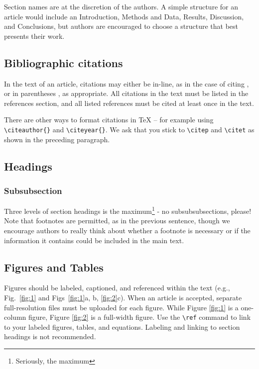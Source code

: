 \documentclass[]{seismica}
\begin{document}
	Section names are at the discretion of the authors. A simple structure for an article would include an Introduction, Methods and Data, Results, Discussion, and Conclusions, but authors are encouraged to choose a structure that best presents their work.
	
	\subsection{Bibliographic citations}
	In the text of an article, citations may either be in-line, as in the case of citing \citet{metropolis_monte_1949}, or in parentheses \citep[e.g.,][]{metropolis_monte_1949}, as appropriate. All citations in the text must be listed in the references section, and all listed references must be cited at least once in the text. 

        There are other ways to format citations in TeX -- for example using \texttt{\textbackslash citeauthor\{\}} and \texttt{\textbackslash citeyear\{\}}. We ask that you stick to \texttt{\textbackslash citep} and \texttt{\textbackslash citet} as shown in the preceding paragraph.
	
	\subsection{Headings}
	\subsubsection{Subsubsection}
	Three levels of section headings is the maximum\footnote{Seriously, the maximum} - no subsubsubsections, please! Note that footnotes are permitted, as in the previous sentence, though we encourage authors to really think about whether a footnote is necessary or if the information it contains could be included in the main text.
	
	\subsection{Figures and Tables}
	Figures should be labeled, captioned, and referenced within the text (e.g., Fig.~\ref{fig:1} and Figs~\ref{fig:1}a, b, \ref{fig:2}c). When an article is accepted, separate full-resolution files must be uploaded for each figure. While Figure \ref{fig:1} is a one-column figure, Figure \ref{fig:2} is a full-width figure. Use the \texttt{\textbackslash ref} command to link to your labeled figures, tables, and equations. Labeling and linking to section headings is not recommended.
	
\end{document}

